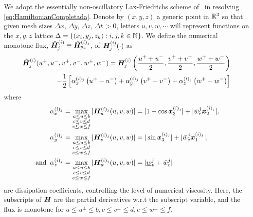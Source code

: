 We adopt the essentially non-oscillatory Lax-Friedrichs scheme of~\cite{OsherShuENO, Crandall1984Approx} in resolving \eqref{eq:HamiltonianCompletada}. Denote by $(x, y, z)$ a generic point in $\mathbb{R}^3$ so that given mesh sizes $\Delta x, \, \Delta y, \, \Delta z, \, \Delta t \, > 0$, letters $u,v,w,\cdots$ will represent functions on the $x,y,z$ lattice $\Delta=\{(x_i,y_j, z_k): i, j, k \in \mathbb{N}\}$. We define the numerical monotone flux, 	$\hat{\bm{H}}_j^{(i)}\equiv \hat{\bm{H}}_{p_k}^{(i)_j}$, of $\bm{H}_j^{(i)}(\cdot)$ as 
%
\begin{align}
	\hat{\bm{H}}_j^{(i)}(u^+, u^-, v^+, v^-, w^+, w^-) = \bm{H}_j^{(i)}\left(\frac{u^+ +u^-}{2}, \frac{v^+ +v^-}{2}, \frac{w^+ +w^-}{2}\right) \nonumber
	\\
	- \dfrac{1}{2}\left[ \alpha_x^{(i)_j} \left(u^+ - u^-\right) + \alpha_y^{(i)_j}\left(v^+ - v^-\right) + \alpha_z^{(i)_j}\left(w^+ - w^-\right)\right]
\end{align}
%
where
%
\begin{subequations}
	\begin{align}
		\alpha_x^{(i)_j} &= \max_{\substack{ a \le u \le b \\ c \le v \le d  \\ e \le w \le f}} |\bm{H}_{u}^{(i)_j}(u, v, w)| = |1 - \cos \bm{x}_3^{(i)_j}|+ |\bar{w}_e^j \bm{x}_2^{(i)_j}|, 
		\\
		\, \alpha_y^{(i)_j} &= \max_{\substack{ a \le u \le b \\ c \le v \le d  \\ e \le w \le f}} |\bm{H}_{v}^{(i)_j}(u, v, w)| = |\sin \bm{x}_3^{(i)_j}| + |\bar{w}_e^j \bm{x}_1^{(i)_j}|, \,  \\
		\text{ and }\, \alpha_z^{(i)_j} &= \max_{\substack{ a \le u \le b \\ c \le v \le d  \\ e \le w \le f}} |\bm{H}_{w}^{(i)_j}(u, v, w)| = |\underline{w}_p^j + \bar{w}_e^j|
	\end{align}
\end{subequations}
%
are dissipation coefficients, controlling the level of numerical viscosity. Here, the subscripts of $\bm{H}$ are the partial derivatives w.r.t the subscript variable, and the flux is monotone for $a \le u^\pm \le b, c \le v^\pm \le d, e \le w^\pm \le f$.


